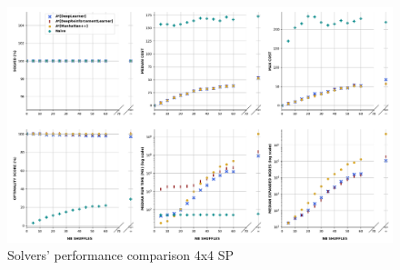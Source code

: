 \begin{landscape}
\centering\vspace*{\fill}
\begin{figure}[H]
\centering
\includegraphics[scale=0.63]{./Figures/44SPPerformanceAll}
\caption[44SPPerformance]{Solvers' performance comparison 4x4 SP}
\label{fig:44SPPerformance}
\end{figure}
\vfill
\end{landscape}
\restoregeometry

